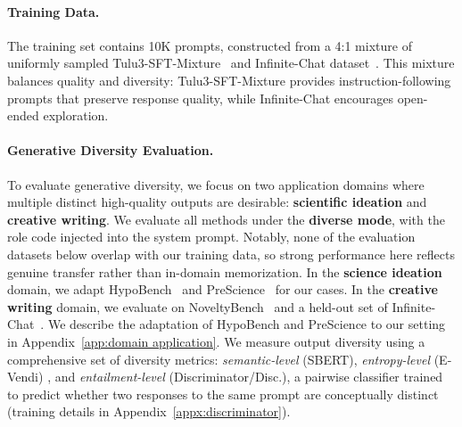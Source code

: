
\paragraph{Training Data.}
\label{subsec:training data}
The training set contains 10K prompts, constructed from a 4:1 mixture of uniformly sampled Tulu3-SFT-Mixture~\citep{lambert2024tulu3} and Infinite-Chat dataset~\citep{jiang2025artificialhivemindopenendedhomogeneity}. This mixture balances quality and diversity: Tulu3-SFT-Mixture provides instruction-following prompts that preserve response quality, while Infinite-Chat encourages open-ended exploration.


\paragraph{Generative Diversity Evaluation.}
To evaluate generative diversity, we focus on two application domains where multiple distinct high-quality outputs are desirable: \textbf{scientific ideation} and \textbf{creative writing}. We evaluate all methods under the \textbf{diverse mode}, with the role code injected into the system prompt. Notably, none of the evaluation datasets below overlap with our training data, so strong performance here reflects genuine transfer rather than in-domain memorization. In the \textbf{science ideation} domain, we adapt HypoBench~\citep{liu2026hypobenchsystematicprincipledbenchmarking} and PreScience~\citep{Ajith2026} for our cases. In the \textbf{creative writing} domain, we evaluate on NoveltyBench~\citep{zhang2025noveltybenchevaluatinglanguagemodels} and a held-out set of Infinite-Chat~\citep{jiang2025artificialhivemindopenendedhomogeneity}. We describe the adaptation of HypoBench and PreScience to our setting in Appendix~\ref{app:domain application}. We measure output diversity using a comprehensive set of diversity metrics: \textit{semantic-level} (SBERT), \textit{entropy-level} (E-Vendi) \citep{friedman2023vendiscorediversityevaluation}, and \textit{entailment-level} (Discriminator/Disc.), a pairwise classifier trained to predict whether two responses to the same prompt are conceptually distinct (training details in Appendix~\ref{appx:discriminator}).


